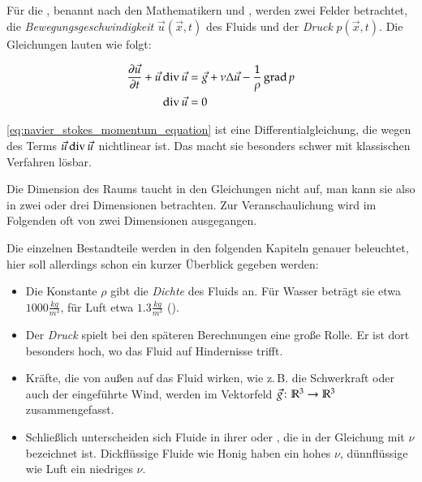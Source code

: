 Für die , benannt nach den
Mathematikern  und , werden zwei Felder betrachtet, die \emph{Bewegungsgeschwindigkeit}
$\vec{u}(\vec{x},t)$ des Fluids und der \emph{Druck} $p(\vec{x},t)$. Die
Gleichungen lauten wie folgt:

\begin{align}
\label{eq:navier_stokes_momentum_equation}
\frac{
	\partial
	\vec{u}
}
{
	\partial t
} +
\vec{u} \operatorname*{div} \vec{u}
& =
\vec{g} +
\nu \Delta \vec{u} -
\frac{
	1
}
{
	\rho
}
\operatorname*{grad} p
\\
\label{eq:navier_stokes_incompressibility_condition}
\operatorname*{div} \vec{u} & = 0
\end{align}

\autoref{eq:navier_stokes_momentum_equation} ist eine Differentialgleichung, die
wegen des Terms $\vec{u} \operatorname*{div} \vec{u}$ nichtlinear ist. Das macht sie
besonders schwer mit klassischen Verfahren lösbar.

Die Dimension des Raums taucht in den Gleichungen nicht auf, man kann sie also
in zwei oder drei Dimensionen betrachten. Zur Veranschaulichung wird im
Folgenden oft von zwei Dimensionen ausgegangen.

Die einzelnen Bestandteile werden in den folgenden Kapiteln genauer beleuchtet,
hier soll allerdings schon ein kurzer Überblick gegeben werden:

\begin{itemize}
\item
	Die Konstante $\rho$ gibt die \emph{Dichte} des Fluids an. Für Wasser beträgt
	sie etwa $1000 \frac{kg}{m^3}$, für Luft etwa $1.3 \frac{kg}{m^3}$
	(\cite{Bridson2007}).
\item
	Der \emph{Druck} spielt bei den späteren Berechnungen eine große Rolle.
	Er ist dort besonders hoch, wo das Fluid auf Hindernisse trifft.
\item
	Kräfte, die von außen auf das Fluid wirken, wie z.\,B. die Schwerkraft
	oder auch der eingeführte Wind, werden im Vektorfeld $\vec{g} \colon
	\mathbb{R}^3 \to \mathbb{R}^3$ zusammengefasst.
\item
	Schließlich unterscheiden sich Fluide in ihrer  oder
	, die in der Gleichung mit $\nu$ bezeichnet ist.
	Dickflüssige Fluide wie Honig haben ein hohes $\nu$, dünnflüssige wie Luft ein
	niedriges $\nu$.
\end{itemize}

